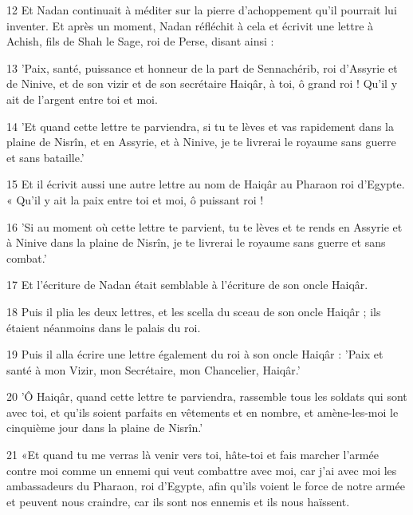 \par 12 Et Nadan continuait à méditer sur la pierre d'achoppement qu'il pourrait lui inventer. Et après un moment, Nadan réfléchit à cela et écrivit une lettre à Achish, fils de Shah le Sage, roi de Perse, disant ainsi :

\par 13 'Paix, santé, puissance et honneur de la part de Sennachérib, roi d'Assyrie et de Ninive, et de son vizir et de son secrétaire Haiqâr, à toi, ô grand roi ! Qu'il y ait de l'argent entre toi et moi.

\par 14 'Et quand cette lettre te parviendra, si tu te lèves et vas rapidement dans la plaine de Nisrîn, et en Assyrie, et à Ninive, je te livrerai le royaume sans guerre et sans bataille.'

\par 15 Et il écrivit aussi une autre lettre au nom de Haiqâr au Pharaon roi d'Egypte. « Qu'il y ait la paix entre toi et moi, ô puissant roi !

\par 16 'Si au moment où cette lettre te parvient, tu te lèves et te rends en Assyrie et à Ninive dans la plaine de Nisrîn, je te livrerai le royaume sans guerre et sans combat.'

\par 17 Et l'écriture de Nadan était semblable à l'écriture de son oncle Haiqâr.

\par 18 Puis il plia les deux lettres, et les scella du sceau de son oncle Haiqâr ; ils étaient néanmoins dans le palais du roi.

\par 19 Puis il alla écrire une lettre également du roi à son oncle Haiqâr : 'Paix et santé à mon Vizir, mon Secrétaire, mon Chancelier, Haiqâr.'

\par 20 'Ô Haiqâr, quand cette lettre te parviendra, rassemble tous les soldats qui sont avec toi, et qu'ils soient parfaits en vêtements et en nombre, et amène-les-moi le cinquième jour dans la plaine de Nisrîn.'

\par 21 «Et quand tu me verras là venir vers toi, hâte-toi et fais marcher l'armée contre moi comme un ennemi qui veut combattre avec moi, car j'ai avec moi les ambassadeurs du Pharaon, roi d'Egypte, afin qu'ils voient le force de notre armée et peuvent nous craindre, car ils sont nos ennemis et ils nous haïssent.

